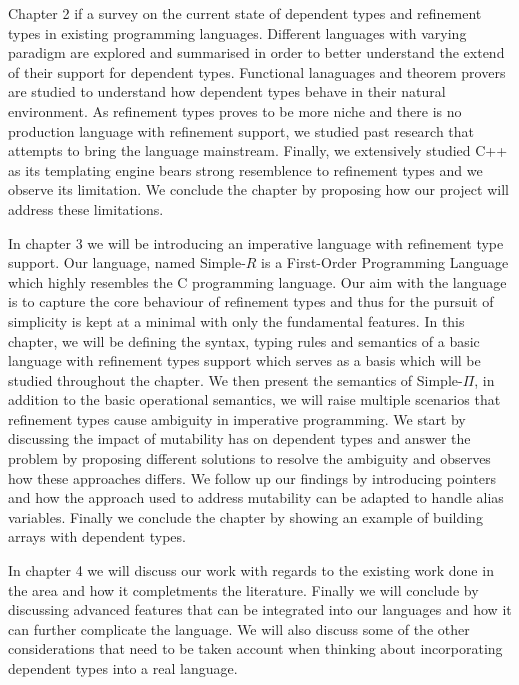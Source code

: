 \documentclass[a4paper,12pt]{report}
\begin{document}
\par
Chapter 2 if a survey on the current state of dependent types and refinement 
types in existing programming languages. Different languages with varying 
paradigm are explored 
and summarised in order to better understand the extend of their support 
for dependent types. Functional lanaguages and theorem provers are studied to 
understand how dependent types behave in their natural environment. As 
refinement types proves to be more niche and there is no production language 
with refinement support, we studied past research that attempts to bring the 
language mainstream. Finally, we extensively studied C++ as its templating 
engine bears strong resemblence to refinement types and we observe its limitation. 
We conclude the chapter by proposing how our project will address these limitations. 

\par
In chapter 3 we will be introducing an imperative language with refinement type support. 
Our language, named Simple-$R$ is a First-Order Programming Language which 
highly resembles the C programming language. Our aim with the language is to 
capture the core behaviour of refinement types and thus for the pursuit 
of simplicity is kept at a minimal with 
only the fundamental features. In this chapter, we will be 
defining the syntax, typing rules and semantics 
of a basic language with refinement types support which serves as a basis 
which will be studied throughout the chapter. 
We then present the semantics of Simple-$\Pi$, in addition 
to the basic operational semantics, we will raise
multiple scenarios that refinement types cause ambiguity in imperative programming. 
We start by discussing the impact of mutability has on dependent types and 
answer the problem by proposing different solutions to resolve the 
ambiguity and observes how these approaches differs. 
We follow up our findings by introducing pointers and how the approach used to 
address mutability can be adapted to handle alias variables. Finally we conclude 
the chapter by showing an example of building arrays with dependent types. 

\par
In chapter 4 we will discuss our work with regards to the 
existing work done in the area and how it completments the literature.
Finally we will conclude by discussing advanced features that can be integrated 
into our languages and how it can further complicate the language. We will also 
discuss some of the other considerations that need to be taken account when 
thinking about incorporating dependent types into a real language. 
\end{document}
